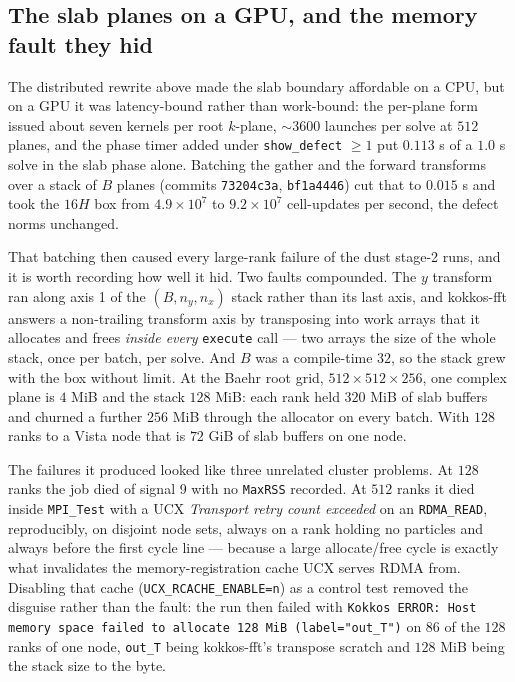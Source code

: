 \documentclass[11pt]{article}
\newcommand{\code}[1]{\texttt{#1}}
\newcommand{\fn}[1]{\texttt{#1}}
\begin{document}
\subsection{The slab planes on a GPU, and the memory fault they hid}
\label{sec:slabgpu}

The distributed rewrite above made the slab boundary affordable on a CPU, but on a GPU
it was latency-bound rather than work-bound: the per-plane form issued about seven
kernels per root $k$-plane, $\sim3600$ launches per solve at $512$ planes, and the
phase timer added under \code{show\_defect} $\ge 1$ put $0.113$ s of a $1.0$ s solve in
the slab phase alone. Batching the gather and the forward transforms over a stack of
$B$ planes (commits \code{73204c3a}, \code{bf1a4446}) cut that to $0.015$ s and took the
$16H$ box from $4.9\times10^{7}$ to $9.2\times10^{7}$ cell-updates per second, the
defect norms unchanged.

That batching then caused every large-rank failure of the dust stage-2 runs, and it is
worth recording how well it hid. Two faults compounded. The $y$ transform ran along
axis 1 of the $(B, n_y, n_x)$ stack rather than its last axis, and kokkos-fft answers a
non-trailing transform axis by transposing into work arrays that it allocates and frees
\emph{inside every} \fn{execute} call --- two arrays the size of the whole stack, once
per batch, per solve. And $B$ was a compile-time $32$, so the stack grew with the box
without limit. At the Baehr root grid, $512\times512\times256$, one complex plane is
$4$ MiB and the stack $128$ MiB: each rank held $320$ MiB of slab buffers and churned a
further $256$ MiB through the allocator on every batch. With $128$ ranks to a Vista
node that is $72$ GiB of slab buffers on one node.

The failures it produced looked like three unrelated cluster problems. At $128$ ranks
the job died of signal 9 with no \code{MaxRSS} recorded. At $512$ ranks it died inside
\fn{MPI\_Test} with a UCX \emph{Transport retry count exceeded} on an \code{RDMA\_READ},
reproducibly, on disjoint node sets, always on a rank holding no particles and always
before the first cycle line --- because a large allocate/free cycle is exactly what
invalidates the memory-registration cache UCX serves RDMA from. Disabling that cache
(\code{UCX\_RCACHE\_ENABLE=n}) as a control test removed the disguise rather than the
fault: the run then failed with \code{Kokkos ERROR: Host memory space failed to
allocate 128 MiB (label="out\_T")} on $86$ of the $128$ ranks of one node, \code{out\_T}
being kokkos-fft's transpose scratch and $128$ MiB being the stack size to the byte.
\end{document}
